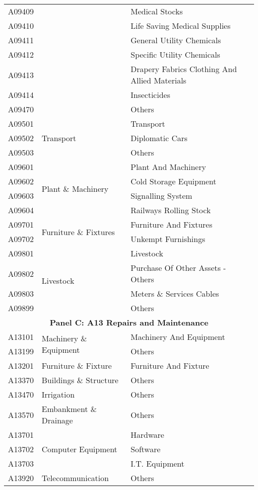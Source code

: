 \begin{longtable}{lll}
	A09409 & & Medical Stocks \\ 
	A09410 & & Life Saving Medical Supplies \\ 
	A09411 & & General Utility Chemicals \\ 
	A09412 & & Specific Utility Chemicals \\ 
	A09413 & & Drapery Fabrics Clothing And Allied Materials \\ 
	A09414 & & Insecticides \\ 
	A09470 & & Others \\ \midrule
	A09501 & \multirow{3}{*}{Transport} & Transport \\ 
	A09502 & & Diplomatic Cars \\ 
	A09503 & & Others \\ \midrule
	A09601 & \multirow{4}{*}{Plant \& Machinery} & Plant And Machinery \\ 
	A09602 & & Cold Storage Equipment \\ 
	A09603 & & Signalling System \\ 
	A09604 & & Railways Rolling Stock \\ \midrule
	A09701 & \multirow{2}{*}{Furniture \& Fixtures} & Furniture And Fixtures \\ 
	A09702 & & Unkempt Furnishings \\ \midrule
	A09801 & \multirow{4}{*}{Livestock} & Livestock \\ 
	A09802 & & Purchase Of Other Assets - Others \\ 
	A09803 & & Meters \& Services Cables \\ 
	A09899 & & Others \\ \midrule
	\multicolumn{3}{c}{\textbf{Panel C: A13 Repairs and Maintenance}} \\ \midrule
	A13101 & \multirow{2}{*}{Machinery \& Equipment} & Machinery And Equipment \\ 
	A13199 & & Others \\ \midrule
	A13201 & Furniture \& Fixture & Furniture And Fixture \\ \midrule
	A13370 & Buildings \& Structure& Others \\ \midrule
	A13470 & Irrigation & Others \\ \midrule
	A13570 & Embankment \& Drainage& Others \\ \midrule
	A13701 & \multirow{3}{*}{Computer Equipment} & Hardware \\ 
	A13702 & & Software \\ 
	A13703 & & I.T. Equipment \\ \midrule
	A13920 & Telecommunication & Others \\ 
\end{longtable}
